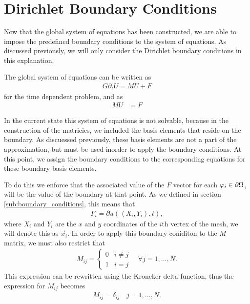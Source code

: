 \documentclass[../fem.tex]{subfile}
\begin{document}
\section{Dirichlet Boundary Conditions}%
\label{sec:dirichlet_boundary_conditions}

Now that the global system of equations has been constructed, we are able to
impose the predefined boundary conditions to the system of equations. As
discussed previously, we will only consider the Dirichlet boundary conditions
in this explanation.

The global system of equations can be written as
\begin{align*}
  G\partial_t U=MU+F
\end{align*}
for the time dependent problem, and as
\begin{align*}
  MU&=F
\end{align*}

In the current state this system of equations is not solvable, because in the
construction of the matricies, we included the basis elements that reside on
the boundary. As discuessed previously, these basis elements are not a part of
the approximation, but must be used inorder to apply the boundary conditions.
At this point, we assign the boundary conditions to the corresponding equations
for these boundary basis elements.

To do this we enforce that the associated value of the $F$ vector for each
$\varphi_i\in\partial \Omega$, will be the value of the boundary at that point. As
we defined in section \ref{sub:boundary_conditions}, this means that
\begin{align*}
  F_i=\partial u\left(\left<X_i,Y_i\right>,t\right),
\end{align*}
where $X_i$ and $Y_i$ are the $x$ and $y$ coordinates of the $i$th vertex of
the mesh, we will denote this as $\vec{x}_i$. In order to apply this boundary
coniditon to the $M$ matrix, we must also restrict that
\begin{align*}
  M_{ij}=\begin{cases}
    0 & i\neq j\\
    1 & i=j
  \end{cases}\quad\forall j=1,\ldots,N.
\end{align*}
This expression can be rewritten using the Kroneker delta function, thus the
expression for $M_{ij}$ becomes
\begin{align*}
  M_{ij}=\delta_{ij}\quad j=1,\ldots,N.
\end{align*}
\end{document}
